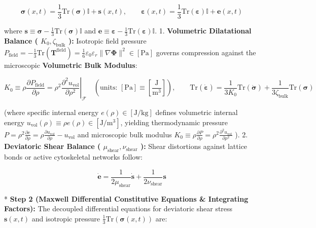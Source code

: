 \documentclass[11pt,a4paper]{article}
\theoremstyle{definition}
\theoremstyle{remark}
\begin{document}
\begin{equation}
\boldsymbol{\sigma}(x, t) = \frac{1}{3}\mathrm{Tr}(\boldsymbol{\sigma})\mathbb{I} + \mathbf{s}(x, t), \qquad \boldsymbol{\varepsilon}(x, t) = \frac{1}{3}\mathrm{Tr}(\boldsymbol{\varepsilon})\mathbb{I} + \mathbf{e}(x, t)
\end{equation}


where $\mathbf{s} \equiv \boldsymbol{\sigma} - \frac{1}{3}\mathrm{Tr}(\boldsymbol{\sigma})\mathbb{I}$ and $\mathbf{e} \equiv \boldsymbol{\varepsilon} - \frac{1}{3}\mathrm{Tr}(\boldsymbol{\varepsilon})\mathbb{I}$.
1. \textbf{Volumetric Dilatational Balance ( $K_0, \zeta_{\text{bulk}}$ ):}
Isotropic field pressure $P_{\text{field}} = -\frac{1}{3}\mathrm{Tr}(\mathbf{T}^{\text{field}}) = \frac{1}{6}\varepsilon_0 \varepsilon_r \|\nabla \mathbf{\Phi}\|^2 \in [\mathrm{Pa}]$ governs compression against the microscopic \textbf{Volumetric Bulk Modulus}:


\begin{equation}
\boxed{K_0 \equiv \rho \frac{\partial P_{\text{field}}}{\partial \rho} = \rho^2 \left.\frac{\partial^2 u_{\text{vol}}}{\partial \rho^2}\right|_{\mathcal{F}} \quad \left( \text{units: } [\mathrm{Pa}] \equiv [\frac{\mathrm{J}}{\mathrm{m^3}}] \right), \qquad \mathrm{Tr}(\dot{\boldsymbol{\varepsilon}}) = \frac{1}{3 K_0} \mathrm{Tr}(\dot{\boldsymbol{\sigma}}) + \frac{1}{3 \zeta_{\text{bulk}}} \mathrm{Tr}(\boldsymbol{\sigma})}
\end{equation}


(where specific internal energy $e(\rho) \in [\mathrm{J/kg}]$ defines volumetric internal energy $u_{\text{vol}}(\rho) \equiv \rho e(\rho) \in [\mathrm{J/m^3}]$, yielding thermodynamic pressure $P = \rho^2 \frac{\partial e}{\partial \rho} = \rho \frac{\partial u_{\text{vol}}}{\partial \rho} - u_{\text{vol}}$ and microscopic bulk modulus $K_0 \equiv \rho \frac{\partial P}{\partial \rho} = \rho^2 \frac{\partial^2 u_{\text{vol}}}{\partial \rho^2}$ ).
2. \textbf{Deviatoric Shear Balance ( $\mu_{\text{shear}}, \nu_{\text{shear}}$ ):}
Shear distortions against lattice bonds or active cytoskeletal networks follow:


\begin{equation}
\dot{\mathbf{e}} = \frac{1}{2 \mu_{\text{shear}}} \dot{\mathbf{s}} + \frac{1}{2 \nu_{\text{shear}}} \mathbf{s}
\end{equation}


* \textbf{Step 2 (Maxwell Differential Constitutive Equations \& Integrating Factors):}
The decoupled differential equations for deviatoric shear stress $\mathbf{s}(x, t)$ and isotropic pressure $\frac{1}{3}\mathrm{Tr}(\boldsymbol{\sigma}(x, t))$ are:
\end{document}
